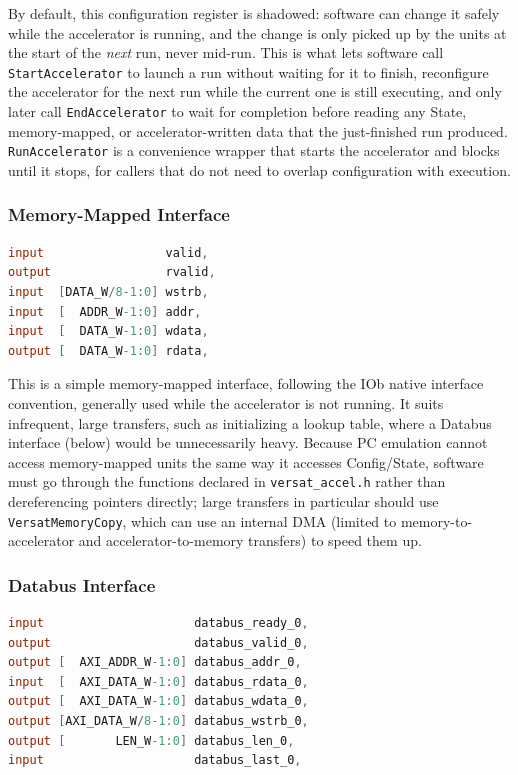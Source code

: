 By default, this configuration register is shadowed: software can change
it safely while the accelerator is running, and the change is only picked
up by the units at the start of the \emph{next} run, never mid-run. This is
what lets software call \texttt{StartAccelerator} to launch a run without
waiting for it to finish, reconfigure the accelerator for the next run
while the current one is still executing, and only later call
\texttt{EndAccelerator} to wait for completion before reading any State,
memory-mapped, or accelerator-written data that the just-finished run
produced. \texttt{RunAccelerator} is a convenience wrapper that starts the
accelerator and blocks until it stops, for callers that do not need to
overlap configuration with execution.

\subsubsection*{Memory-Mapped Interface}

\begin{lstlisting}[language=Verilog,caption={Memory-mapped interface, following the IOb native interface convention.},label={lst:if_mem_mapped}]
input                 valid,
output                rvalid,
input  [DATA_W/8-1:0] wstrb,
input  [  ADDR_W-1:0] addr,
input  [  DATA_W-1:0] wdata,
output [  DATA_W-1:0] rdata,
\end{lstlisting}

This is a simple memory-mapped interface, following the IOb native
interface convention, generally used while the accelerator is not
running. It suits infrequent, large transfers, such as initializing a
lookup table, where a Databus interface (below) would be unnecessarily
heavy. Because PC emulation cannot access memory-mapped units the same way
it accesses Config/State, software must go through the functions declared
in \texttt{versat\_accel.h} rather than dereferencing pointers directly;
large transfers in particular should use \texttt{VersatMemoryCopy}, which
can use an internal DMA (limited to memory-to-accelerator and
accelerator-to-memory transfers) to speed them up.

\subsubsection*{Databus Interface}
\label{sec:if_databus}

\begin{lstlisting}[language=Verilog,caption={Databus interface, indexed per instance (here, index 0).},label={lst:if_databus}]
input                     databus_ready_0,
output                    databus_valid_0,
output [  AXI_ADDR_W-1:0] databus_addr_0,
input  [  AXI_DATA_W-1:0] databus_rdata_0,
output [  AXI_DATA_W-1:0] databus_wdata_0,
output [AXI_DATA_W/8-1:0] databus_wstrb_0,
output [       LEN_W-1:0] databus_len_0,
input                     databus_last_0,
\end{lstlisting}

